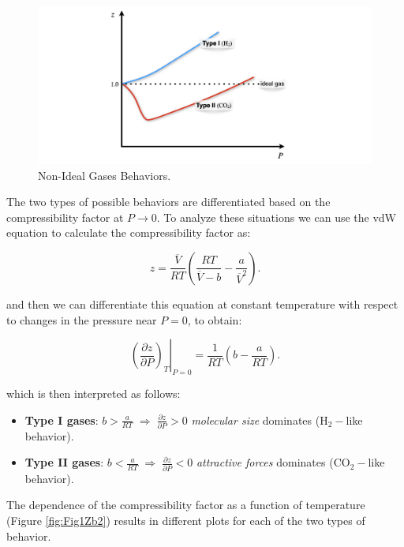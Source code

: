 \documentclass[
  9pt,
]{extbook}
\providecommand{\tightlist}{%
  \setlength{\itemsep}{0pt}\setlength{\parskip}{0pt}}
\theoremstyle{definition}
\theoremstyle{definition}
\theoremstyle{definition}
\theoremstyle{remark}
\begin{document}
\begin{figure}

{\centering \includegraphics[width=0.8\linewidth]{./img/OEP_Figures.012} 

}

\caption{Non-Ideal Gases Behaviors.}\label{fig:FigZb}
\end{figure}

The two types of possible behaviors are differentiated based on the compressibility factor at \(P\rightarrow 0\). To analyze these situations we can use the vdW equation to calculate the compressibility factor as:

\begin{equation}
z= \frac{\overline{V}}{RT} \left( \frac{RT}{\overline{V}-b} -\frac{a}{\overline{V}^2} \right).
\label{eq:compr1}
\end{equation}

and then we can differentiate this equation at constant temperature with respect to changes in the pressure near \(P=0\), to obtain:

\begin{equation}
\left. \left( \frac{\partial z}{\partial P}\right)_T \right|_{P=0} = \frac{1}{RT} \left( b -\frac{a}{RT} \right).
\label{eq:compr2}
\end{equation}

which is then interpreted as follows:

\begin{itemize}
\tightlist
\item
  \textbf{Type I gases}: \(b>\frac{a}{RT} \; \Rightarrow \; \frac{\partial z}{\partial P} > 0\) \emph{molecular size} dominates (\(\mathrm{H}_2-\)like behavior).
\item
  \textbf{Type II gases}: \(b<\frac{a}{RT} \; \Rightarrow \; \frac{\partial z}{\partial P} < 0\) \emph{attractive forces} dominates (\(\mathrm{CO}_2-\)like behavior).
\end{itemize}

The dependence of the compressibility factor as a function of temperature (Figure \ref{fig:Fig1Zb2}) results in different plots for each of the two types of behavior.
\end{document}
